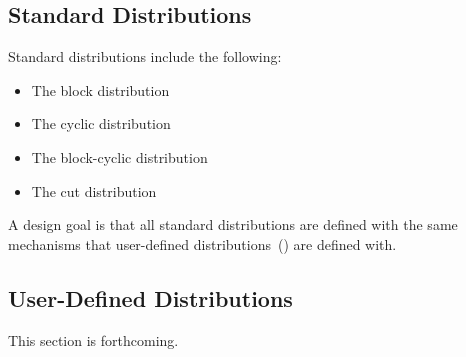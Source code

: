 \subsection{Standard Distributions}
\label{Standard_Distributions}

Standard distributions include the following:
\begin{itemize}
\item The block distribution 
\item The cyclic distribution 
\item The block-cyclic distribution 
\item The cut distribution 
\end{itemize}

A design goal is that all standard distributions are defined with the
same mechanisms that user-defined
distributions~() are defined with.

\subsection{User-Defined Distributions}
\label{User_Defined_Distributions}

This section is forthcoming.

